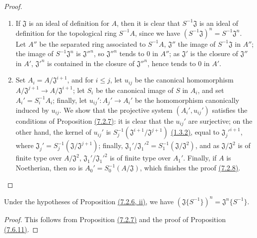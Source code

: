 \begin{proof}
\label{proof-7.6.11}
\medskip\noindent
\begin{enumerate}[label=(\roman*)]
  \item If $\mathfrak{J}$ is an ideal of definition for $A$, then it is clear that
    $S^{-1}\mathfrak{J}$ is an ideal of definition for the topological ring $S^{-1}A$, since we
    have $(S^{-1}\mathfrak{J})^n=S^{-1}\mathfrak{J}^n$. Let $A''$ be the separated ring associated
    to $S^{-1}A$, $\mathfrak{J}''$ the image of $S^{-1}\mathfrak{J}$ in $A''$; the image of
    $S^{-1}\mathfrak{J}^n$ is ${\mathfrak{J}''}^n$, so ${\mathfrak{J}''}^n$ tends to $0$ in $A''$;
    as $\mathfrak{J}'$ is the closure of $\mathfrak{J}''$ in $A'$, ${\mathfrak{J}'}^n$ is contained
    in the closure of ${\mathfrak{J}''}^n$, hence tends to $0$ in $A'$.
  \item Set $A_i=A/\mathfrak{J}^{i+1}$, and for $i\leqslant j$, let $u_{ij}$ be the canonical
    homomorphism $A/\mathfrak{J}^{j+1}\to A/\mathfrak{J}^{i+1}$; let $S_i$ be the canonical image of
    $S$ in $A_i$, and set $A_i'=S_i^{-1}A_i$; finally, let $u_{ij}':A_j'\to A_i'$ be the homomorphism
    canonically induced by $u_{ij}$. We show that the projective system $(A_i',u_{ij}')$ satisfies
    the conditions of Proposition \hyperref[0.7.2.7]{(7.2.7)}: it is clear that the $u_{ij}'$
    are surjective; on the other hand, the kernel of $u_{ij}'$ is
    $S_j^{-1}(\mathfrak{J}^{i+1}/\mathfrak{J}^{j+1})$ \hyperref[0.1.3.2]{(1.3.2)}, equal to
    ${\mathfrak{J}_j'}^{i+1}$, where $\mathfrak{J}_j'=S_j^{-1}(\mathfrak{J}/\mathfrak{J}^{j+1})$;
    finally, $\mathfrak{J}_1'/{\mathfrak{J}_1'}^2=S_1^{-1}(\mathfrak{J}/\mathfrak{J}^2)$, and as
    $\mathfrak{J}/\mathfrak{J}^2$ is of finite type over $A/\mathfrak{J}^2$,
    $\mathfrak{J}_1'/{\mathfrak{J}_1'}^2$ is of finite type over $A_1'$. Finally, if $A$ is
    Noetherian, then so is $A_0'=S_0^{-1}(A/\mathfrak{J})$, which finishes the proof
    \hyperref[0.7.2.8]{(7.2.8)}.
\end{enumerate}
\end{proof}

\begin{cor}[7.6.12]
\label{0.7.6.12}
Under the hypotheses of Proposition \hyperref[0.7.6.11]{(7.2.6, ii)}, we have
$(\mathfrak{J}\{S^{-1}\})^n=\mathfrak{J}^n\{S^{-1}\}$.
\end{cor}

\begin{proof}
\label{proof-0.7.6.12}
This follows from Proposition \hyperref[0.7.2.7]{(7.2.7)} and the proof of
Proposition \hyperref[0.7.6.11]{(7.6.11)}.
\end{proof}

